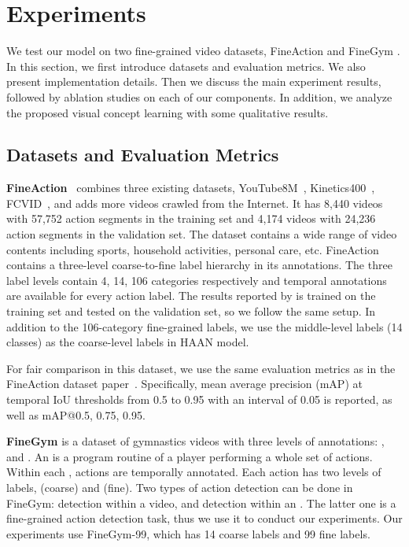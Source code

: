 \section{Experiments}






We test our model on two fine-grained video datasets, FineAction \cite{liu2021fineaction} and FineGym \cite{shao2020finegym}. In this section, we first introduce datasets and evaluation metrics. We also present implementation details. Then we discuss the main experiment results, followed by ablation studies on each of our components. In addition, we analyze the proposed visual concept learning with some qualitative results. 

\subsection{Datasets and Evaluation Metrics}

\textbf{FineAction}~\cite{liu2021fineaction} combines three existing datasets, YouTube8M~\cite{abu2016youtube}, Kinetics400~\cite{carreira2017quo}, FCVID~\cite{jiangfcvid}, and adds more videos crawled from the Internet. It has 8,440 videos with 57,752 action segments in the training set and 4,174 videos with 24,236 action segments in the validation set. The dataset contains a wide range of video contents including sports, household activities, personal care, etc. FineAction contains a three-level coarse-to-fine label hierarchy in its annotations. The three label levels contain 4, 14, 106 categories respectively and temporal annotations are available for every action label. The results reported by \cite{liu2021fineaction} is trained on the training set and tested on the validation set, so we follow the same setup. In addition to the 106-category fine-grained labels, we use the middle-level labels (14 classes) as the coarse-level labels in HAAN model.

For fair comparison in this dataset, we use the same evaluation metrics as in the FineAction dataset paper~\cite{liu2021fineaction}. Specifically, mean average precision (mAP) at temporal IoU thresholds from 0.5 to 0.95 with an interval of 0.05 is reported, as well as mAP@{0.5, 0.75, 0.95}.

\textbf{FineGym} \cite{shao2020finegym} is a dataset of gymnastics videos with three levels of annotations: ,  and . An  is a program routine of a player performing a whole set of actions. Within each , actions are temporally annotated. Each action has two levels of labels,  (coarse) and  (fine). Two types of action detection can be done in FineGym:  detection within a video, and  detection within an . The latter one is a fine-grained action detection task, thus we use it to conduct our experiments. Our experiments use FineGym-99, which has 14 coarse labels and 99 fine labels. 


